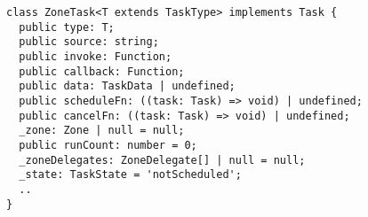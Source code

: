 \begin{verbatim}
class ZoneTask<T extends TaskType> implements Task {
  public type: T;
  public source: string;
  public invoke: Function;
  public callback: Function;
  public data: TaskData | undefined;
  public scheduleFn: ((task: Task) => void) | undefined;
  public cancelFn: ((task: Task) => void) | undefined;
  _zone: Zone | null = null;
  public runCount: number = 0;
  _zoneDelegates: ZoneDelegate[] | null = null;
  _state: TaskState = 'notScheduled';
  ..
}
\end{verbatim}
